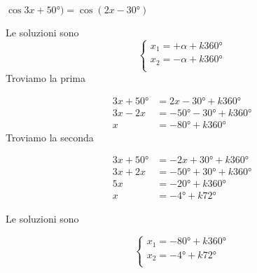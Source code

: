 	$\cos3x+\ang{50;;})=\cos(2x-\ang{30;;})$

	Le soluzioni sono
	\[\begin{cases}
	x_1=+\alpha+k\ang{360;;}\\
	x_2=-\alpha+k\ang{360;;}\\
	\end{cases}\]
	Troviamo la prima

	\begin{align*}
	3x+\ang{50;;}&=2x-\ang{30;;}+k\ang{360;;}\\
	3x-2x&=-\ang{50;;}-\ang{30;;}+k\ang{360;;}\\
	x&=-\ang{80;;}+k\ang{360;;}
	\end{align*}
 Troviamo la seconda

	\begin{align*}
	3x+\ang{50;;}&=-2x+\ang{30;;}+k\ang{360;;}\\
	3x+2x&=-\ang{50;;}+\ang{30;;}+k\ang{360;;}\\
	5x&=-\ang{20;;}+k\ang{360;;}\\
 x&=-\ang{4;;}+k\ang{72;;}
	\end{align*}

	Le soluzioni sono

	\[\begin{cases}
	x_1=-\ang{80;;}+k\ang{360;;}\\
	x_2=-\ang{4;;}+k\ang{72;;}\\
	\end{cases}\]
